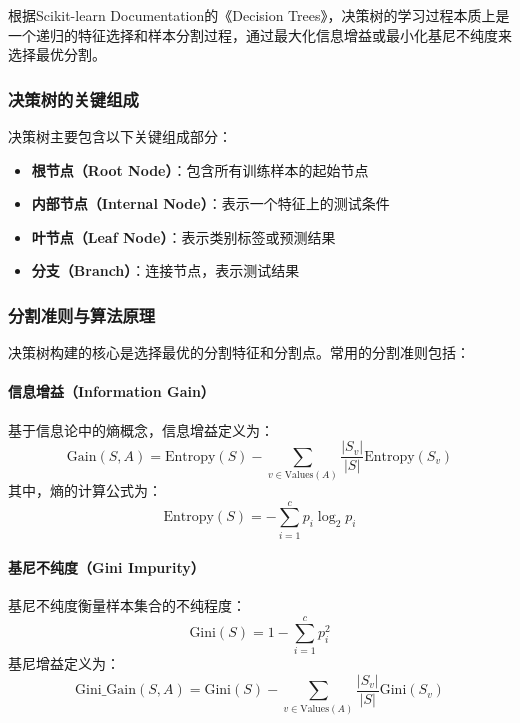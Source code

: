 \documentclass[UTF8]{report}
\theoremstyle{MyLineTheoremStyle} %
\theoremstyle{MyBlockTheoremStyle} %
\theoremstyle{MySubsubsectionStyle} %
\begin{document}
根据Scikit-learn Documentation的《Decision Trees》，决策树的学习过程本质上是一个递归的特征选择和样本分割过程，通过最大化信息增益或最小化基尼不纯度来选择最优分割。

\subsubsection{决策树的关键组成}

决策树主要包含以下关键组成部分：

\begin{itemize}
    \item \textbf{根节点（Root Node）}：包含所有训练样本的起始节点
    \item \textbf{内部节点（Internal Node）}：表示一个特征上的测试条件
    \item \textbf{叶节点（Leaf Node）}：表示类别标签或预测结果
    \item \textbf{分支（Branch）}：连接节点，表示测试结果
\end{itemize}

\subsubsection{分割准则与算法原理}

决策树构建的核心是选择最优的分割特征和分割点。常用的分割准则包括：

\paragraph{信息增益（Information Gain）}
基于信息论中的熵概念，信息增益定义为：
\begin{equation}
\text{Gain}(S, A) = \text{Entropy}(S) - \sum_{v \in \text{Values}(A)} \frac{|S_v|}{|S|} \text{Entropy}(S_v)
\end{equation}
其中，熵的计算公式为：
\begin{equation}
\text{Entropy}(S) = -\sum_{i=1}^{c} p_i \log_2 p_i
\end{equation}

\paragraph{基尼不纯度（Gini Impurity）}
基尼不纯度衡量样本集合的不纯程度：
\begin{equation}
\text{Gini}(S) = 1 - \sum_{i=1}^{c} p_i^2
\end{equation}
基尼增益定义为：
\begin{equation}
\text{Gini\_Gain}(S, A) = \text{Gini}(S) - \sum_{v \in \text{Values}(A)} \frac{|S_v|}{|S|} \text{Gini}(S_v)
\end{equation}
\end{document}
